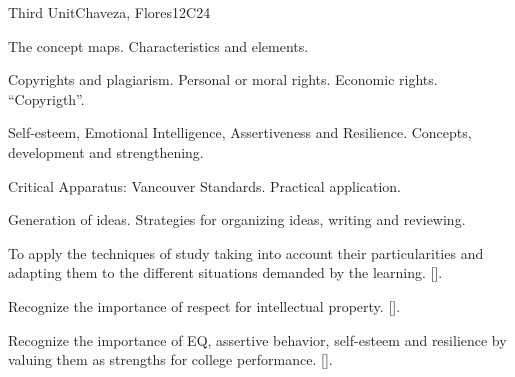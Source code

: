 \begin{syllabus}
\begin{unit}{}{Third Unit}{Chaveza, Flores}{12}{C24}
\begin{topics}
        \item The concept maps. Characteristics and elements.
        \item Copyrights and plagiarism. Personal or moral rights. Economic rights. ``Copyrigth''.
        \item Self-esteem, Emotional Intelligence, Assertiveness and Resilience. Concepts, development and strengthening.
        \item Critical Apparatus: Vancouver Standards. Practical application.
        \item Generation of ideas. Strategies for organizing ideas, writing and reviewing.
\end{topics}
\begin{learningoutcomes}
        \item To apply the techniques of study taking into account their particularities and adapting them to the different situations demanded by the learning. [\Usage].
        \item Recognize the importance of respect for intellectual property. [\Usage].
        \item Recognize the importance of EQ, assertive behavior, self-esteem and resilience by valuing them as strengths for college performance. [\Usage].
\end{learningoutcomes}
\end{unit}


\end{syllabus}
